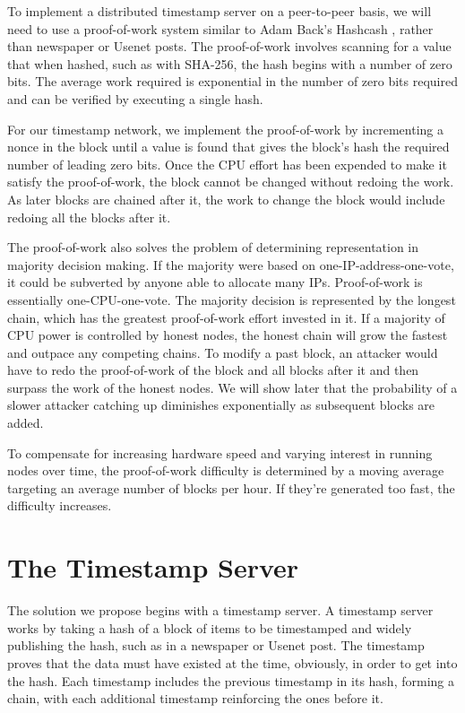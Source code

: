 \documentclass{article}
\begin{document}
To implement a distributed timestamp server on a peer-to-peer basis, we will need to use a proof-of-work system similar to Adam Back's Hashcash \cite{back2002hashcash}, rather than newspaper or Usenet posts. The proof-of-work involves scanning for a value that when hashed, such as with SHA-256, the hash begins with a number of zero bits. The average work required is exponential in the number of zero bits required and can be verified by executing a single hash.

For our timestamp network, we implement the proof-of-work by incrementing a nonce in the block until a value is found that gives the block's hash the required number of leading zero bits. Once the CPU effort has been expended to make it satisfy the proof-of-work, the block cannot be changed without redoing the work. As later blocks are chained after it, the work to change the block would include redoing all the blocks after it.

The proof-of-work also solves the problem of determining representation in majority decision making. If the majority were based on one-IP-address-one-vote, it could be subverted by anyone able to allocate many IPs. Proof-of-work is essentially one-CPU-one-vote. The majority decision is represented by the longest chain, which has the greatest proof-of-work effort invested in it. If a majority of CPU power is controlled by honest nodes, the honest chain will grow the fastest and outpace any competing chains. To modify a past block, an attacker would have to redo the proof-of-work of the block and all blocks after it and then surpass the work of the honest nodes. We will show later that the probability of a slower attacker catching up diminishes exponentially as subsequent blocks are added.

To compensate for increasing hardware speed and varying interest in running nodes over time, the proof-of-work difficulty is determined by a moving average targeting an average number of blocks per hour. If they're generated too fast, the difficulty increases.

\section{The Timestamp Server}

The solution we propose begins with a timestamp server. A timestamp server works by taking a hash of a block of items to be timestamped and widely publishing the hash, such as in a newspaper or Usenet post. The timestamp proves that the data must have existed at the time, obviously, in order to get into the hash. Each timestamp includes the previous timestamp in its hash, forming a chain, with each additional timestamp reinforcing the ones before it.
\end{document}
